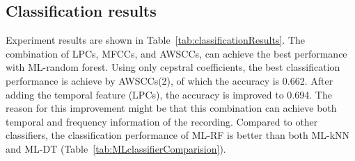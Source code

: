 \subsection{Classification results}

Experiment results are shown in Table~\ref{tab:classificationResults}. The combination of LPCs, MFCCs, and AWSCCs, can achieve the best performance with ML-random forest. Using only cepstral coefficients, the best classification performance is achieve by AWSCCs(2), of which the accuracy is 0.662. After adding the temporal feature (LPCs), the accuracy is improved to 0.694. The reason for this improvement might be that this combination can achieve both temporal and frequency information of the recording. Compared to other classifiers, the classification performance of ML-RF is better than both ML-kNN and ML-DT (Table~\ref{tab:MLclassifierComparision}).



\begin{table}[htb!]
\centering
\caption{Comparison of different feature sets for ML classification}
\label{tab:classificationResults}
\end{table}




